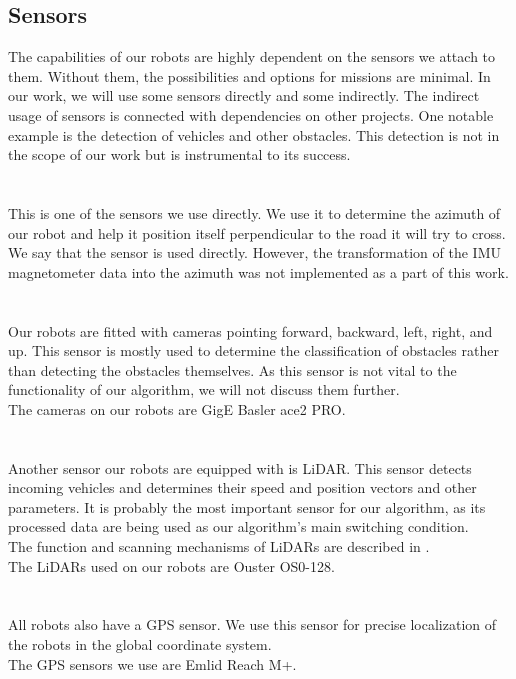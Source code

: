     \subsection{Sensors}
        The capabilities of our robots are highly dependent on the sensors we attach to them. Without them, the possibilities and options for missions are minimal. In our work, we will use some sensors directly and some indirectly. The indirect usage of sensors is connected with dependencies on other projects. One notable example is the detection of vehicles and other obstacles. This detection is not in the scope of our work but is instrumental to its success.\\\\
        \\
            This is one of the sensors we use directly. We use it to determine the azimuth of our robot and help it position itself perpendicular to the road it will try to cross.\\
            We say that the sensor is used directly. However, the transformation of the IMU magnetometer data into the azimuth was not implemented as a part of this work.\\\\
        \\
            Our robots are fitted with cameras pointing forward, backward, left, right, and up. This sensor is mostly used to determine the classification of obstacles rather than detecting the obstacles themselves. As this sensor is not vital to the functionality of our algorithm, we will not discuss them further.\\
            The cameras on our robots are GigE Basler ace2 PRO.\\\\
        \\
            Another sensor our robots are equipped with is LiDAR. This sensor detects incoming vehicles and determines their speed and position vectors and other parameters. It is probably the most important sensor for our algorithm, as its processed data are being used as our algorithm's main switching condition.\\
            The function and scanning mechanisms of LiDARs are described in \cite{LiDAR}.\\
            The LiDARs used on our robots are Ouster OS0-128.\\\\
        \\
            All robots also have a GPS sensor. We use this sensor for precise localization of the robots in the global coordinate system.\\
            The GPS sensors we use are Emlid Reach M+.